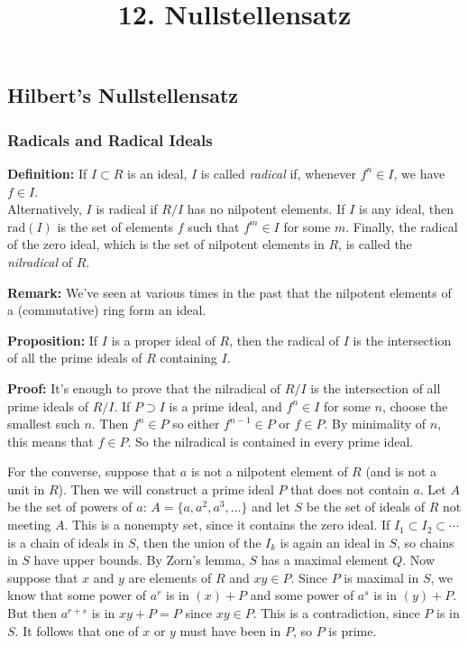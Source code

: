 \documentclass[]{article}
\title{12. Nullstellensatz}
\date{}
\begin{document}
\maketitle

\hypertarget{hilberts-nullstellensatz}{%
\subsection{Hilbert's Nullstellensatz}\label{hilberts-nullstellensatz}}

\hypertarget{radicals-and-radical-ideals}{%
\subsubsection{Radicals and Radical
Ideals}\label{radicals-and-radical-ideals}}

\textbf{Definition:} If \(I\subset R\) is an ideal, \(I\) is called
\emph{radical} if, whenever \(f^n\in I\), we have \(f\in I\).\\
Alternatively, \(I\) is radical if \(R/I\) has no nilpotent elements. If
\(I\) is any ideal, then \(\mathrm{rad}(I)\) is the set of elements
\(f\) such that \(f^{m}\in I\) for some \(m\). Finally, the radical of
the zero ideal, which is the set of nilpotent elements in \(R\), is
called the \emph{nilradical} of \(R\).

\textbf{Remark:} We've seen at various times in the past that the
nilpotent elements of a (commutative) ring form an ideal.

\textbf{Proposition:} If \(I\) is a proper ideal of \(R\), then the
radical of \(I\) is the intersection of all the prime ideals of \(R\)
containing \(I\).

\textbf{Proof:} It's enough to prove that the nilradical of \(R/I\) is
the intersection of all prime ideals of \(R/I\). If \(P\supset I\) is a
prime ideal, and \(f^{n}\in I\) for some \(n\), choose the smallest such
\(n\). Then \(f^{n}\in P\) so either \(f^{n-1}\in P\) or \(f\in P\). By
minimality of \(n\), this means that \(f\in P\). So the nilradical is
contained in every prime ideal.

For the converse, suppose that \(a\) is not a nilpotent element of \(R\)
(and is not a unit in \(R\)). Then we will construct a prime ideal \(P\)
that does not contain \(a\). Let \(A\) be the set of powers of \(a\):
\(A=\{a,a^2,a^3,\ldots\}\) and let \(S\) be the set of ideals of \(R\)
not meeting \(A\). This is a nonempty set, since it contains the zero
ideal. If \(I_1\subset I_2\subset\cdots\) is a chain of ideals in \(S\),
then the union of the \(I_{k}\) is again an ideal in \(S\), so chains in
\(S\) have upper bounds. By Zorn's lemma, \(S\) has a maximal element
\(Q\). Now suppose that \(x\) and \(y\) are elements of \(R\) and
\(xy\in P\). Since \(P\) is maximal in \(S\), we know that some power of
\(a^r\) is in \((x)+P\) and some power of \(a^s\) is in \((y)+P\). But
then \(a^{r+s}\) is in \(xy+P=P\) since \(xy\in P\). This is a
contradiction, since \(P\) is in \(S\). It follows that one of \(x\) or
\(y\) must have been in \(P\), so \(P\) is prime.
\end{document}
